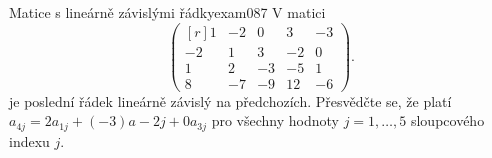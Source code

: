\begin{mathexam}{Matice s lineárně závislými řádky}{exam087}
  V matici
  \begin{equation*}
    \begin{pmatrix*}[r]
      1 & -2 &  0 &  3 & -3  \\
     -2 &  1 &  3 & -2 &  0  \\
      1 &  2 & -3 & -5 &  1  \\
      8 & -7 & -9 & 12 & -6 
    \end{pmatrix*}.
  \end{equation*}
  je poslední řádek lineárně závislý na předchozích. Přesvědčte se, že platí \(a_{4j}= 2a_{1j} + 
  (-3)a - {2j} + 0a_{3j}\) pro všechny hodnoty \(j = 1, \ldots, 5\) sloupcového indexu \(j\).
\end{mathexam}